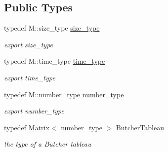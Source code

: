 \subsection*{Public Types}
\begin{DoxyCompactItemize}
\item 
\hypertarget{classhdnum_1_1DIRK_a80ab2ad1360bc6061cea64d7a5ca9d12}{
typedef M::size\_\-type \hyperlink{classhdnum_1_1DIRK_a80ab2ad1360bc6061cea64d7a5ca9d12}{size\_\-type}}
\label{classhdnum_1_1DIRK_a80ab2ad1360bc6061cea64d7a5ca9d12}

\begin{DoxyCompactList}\small\item\em export size\_\-type \item\end{DoxyCompactList}\item 
\hypertarget{classhdnum_1_1DIRK_a91204fa2e007b5eed35034bfe409037b}{
typedef M::time\_\-type \hyperlink{classhdnum_1_1DIRK_a91204fa2e007b5eed35034bfe409037b}{time\_\-type}}
\label{classhdnum_1_1DIRK_a91204fa2e007b5eed35034bfe409037b}

\begin{DoxyCompactList}\small\item\em export time\_\-type \item\end{DoxyCompactList}\item 
\hypertarget{classhdnum_1_1DIRK_a287d241d2d7cc622d8688bd062b73183}{
typedef M::number\_\-type \hyperlink{classhdnum_1_1DIRK_a287d241d2d7cc622d8688bd062b73183}{number\_\-type}}
\label{classhdnum_1_1DIRK_a287d241d2d7cc622d8688bd062b73183}

\begin{DoxyCompactList}\small\item\em export number\_\-type \item\end{DoxyCompactList}\item 
\hypertarget{classhdnum_1_1DIRK_ac086e9474953dd982e3192f892039d67}{
typedef \hyperlink{classhdnum_1_1Matrix}{Matrix}$<$ \hyperlink{classhdnum_1_1DIRK_a287d241d2d7cc622d8688bd062b73183}{number\_\-type} $>$ \hyperlink{classhdnum_1_1DIRK_ac086e9474953dd982e3192f892039d67}{ButcherTableau}}
\label{classhdnum_1_1DIRK_ac086e9474953dd982e3192f892039d67}

\begin{DoxyCompactList}\small\item\em the type of a Butcher tableau \item\end{DoxyCompactList}\end{DoxyCompactItemize}
